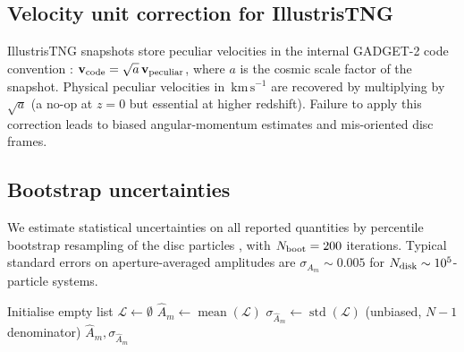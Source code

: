\documentclass[fleqn,usenatbib]{mnras}
\newcommand{\Am}[1]{A_{#1}}
\newcommand{\kms}{\,\mathrm{km\,s^{-1}}}
\newcommand{\Nboot}{N_{\rm boot}}
\newcommand{\Ndisk}{N_{\rm disk}}
\begin{document}
\subsection{Velocity unit correction for IllustrisTNG}
\label{sec:sqrt_a}

IllustrisTNG snapshots store peculiar velocities in the internal
GADGET-2 code convention
\citep[][and IllustrisTNG data-release documentation]{2005MNRAS.364.1105S,2019ComAC...6....2N}:
$\mathbf{v}_{\rm code} = \sqrt{a}\,\mathbf{v}_{\rm peculiar}$,
where $a$ is the cosmic scale factor of the snapshot.  Physical
peculiar velocities in $\kms$ are recovered by multiplying by
$\sqrt{a}$ (a no-op at $z=0$ but essential at higher redshift).
Failure to apply this correction leads to biased
angular-momentum estimates and mis-oriented disc frames.

\subsection{Bootstrap uncertainties}
\label{sec:bootstrap}

We estimate statistical uncertainties on all reported quantities by
percentile bootstrap resampling of the disc particles
\citep[][§13.4]{Efron1995AnIT}, with $\Nboot = 200$
iterations.  Typical standard errors on aperture-averaged
amplitudes are $\sigma_{\Am{m}} \sim 0.005$ for
$\Ndisk \sim 10^5$-particle systems.


\begin{algorithm}[t]
  \caption{Bootstrap uncertainty on global amplitude
    (\textsc{bootstrap\_amplitude})}
  \label{alg:bootstrap}
  \DontPrintSemicolon
  \BlankLine
  Initialise empty list $\mathcal{L} \leftarrow \emptyset$\;
  $\hat A_m \leftarrow \operatorname{mean}(\mathcal{L})$\;
  $\sigma_{\hat A_m} \leftarrow \operatorname{std}(\mathcal{L})$
        (unbiased, $N-1$ denominator)\;
  \Return $\hat A_m, \sigma_{\hat A_m}$
\end{algorithm}
\end{document}
